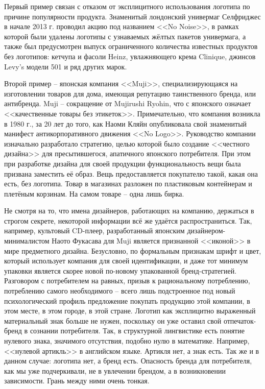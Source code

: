 Первый пример связан с отказом от эксплицитного использования логотипа по причине популярности
продукта. Знаменитый лондонский универмаг Селфриджес в начале 2013 г. проводил акцию под названием
<<No Noise>>, в рамках которой были удалены логотипы с узнаваемых жёлтых пакетов универмага, а также
был предусмотрен выпуск ограниченного количества известных продуктов без логотипов: кетчупа и фасоли
Heinz, увлажняющего крема Clinique, джинсов Levy's модели 501 и ряд других марок.

Второй пример -- японская компания <<Muji>>, специализирующаяся на изготовлении товаров для дома,
имеющая репутацию таинственного бренда, или антибренда. Muji -- сокращение от Mujirushi
Ryohin, что с японского означает <<качественные товары без этикеток>>. Примечательно, что
компания возникла в 1980 г., за 20 лет до того, как Наоми Кляйн опубликовала свой знаменитый
манифест антикорпоративного движения <<No Logo>>. Руководство компании изначально разработало
стратегию, целью которой было создание <<честного дизайна>> для пресытившегося, апатичного японского
потребителя. При этом при разработке дизайна для своей продукции функциональность вещи была призвана
заместить её образ. Вещь предоставляется покупателю такой, какая она есть, без логотипа. Товар в
магазинах разложен по пластиковым контейнерам и плетёным корзинам. На самом товаре -- одна лишь
бирка.

Не смотря на то, что имена дизайнеров, работающих на компанию, держаться в строгом секрете,
некоторой информации всё же удаётся распространиться. Так, например, культовый CD-плеер,
разработанный японским дизайнером-минималистом Наото Фукасава для Muji является признанной <<иконой>>
в мире предметного дизайна. Безусловно, по формальным признакам шрифт и цвет, который использует
компания для своей идентификации, и даже тот минимум упаковки является скорее новой по-новому
упакованной бренд-стратегией.  Разговором с потребителем на равных, призыв к рациональному
потреблению, потреблению самого необходимого -- всего лишь подстроенное под новый психологический
профиль предложение покупать продукцию этой компании, в этом месте, в этом городе, в этой
стране. Логотип как эксплицитно выраженный материальный знак больше не нужен, поскольку он уже
оставил свой отпечаток-бренд  в сознании потребителя. Так, в структурной лингвистике есть понятие
нулевого знака, значимого отсутствия, подобно нулю в математике. Например, <<нулевой артикль>> в
английском языке. Артикля нет, а знак есть. Так же и в данном случае: логотипа нет, а бренд
есть. Опасность бренда для потребителя, как мы уже подчеркивали, не в увлечении брендом, а в
возникновении зависимости. Грань между ними очень тонкая.

